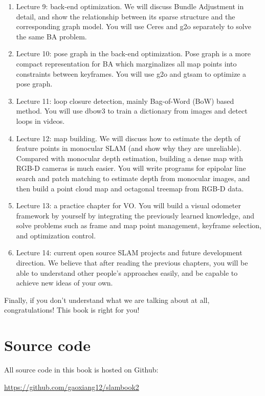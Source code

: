 \begin{enumerate}
	\item Lecture 9: back-end optimization. We will discuss Bundle Adjustment in detail, and show the relationship between its sparse structure and the corresponding graph model. You will use Ceres and g2o separately to solve the same BA problem.
	
	\item Lecture 10: pose graph in the back-end optimization. Pose graph is a more compact representation for BA which marginalizes all map points into constraints between keyframes. You will use g2o and gtsam to optimize a pose graph.
	
	\item Lecture 11: loop closure detection, mainly Bag-of-Word (BoW) based method. You will use dbow3 to train a dictionary from images and detect loops in videos. 
	
	\item Lecture 12: map building. We will discuss how to estimate the depth of feature points in monocular SLAM  (and show why they are unreliable). Compared with monocular depth estimation, building a dense map with RGB-D cameras is much easier. You will write programs for epipolar line search and patch matching to estimate depth from monocular images, and then build a point cloud map and octagonal treemap from RGB-D data.
	
	\item Lecture 13: a practice chapter for VO. You will build a visual odometer framework by yourself by integrating the previously learned knowledge, and solve problems such as frame and map point management, keyframe selection, and optimization control.
	
	\item Lecture 14: current open source SLAM projects and future development direction. We believe that after reading the previous chapters, you will be able to understand other people's approaches easily, and be capable to achieve new ideas of your own.
\end{enumerate}

Finally, if you don't understand what we are talking about at all, congratulations! This book is right for you! 

\section{Source code}

All source code in this book is hosted on Github:

{\hfill\url{https://github.com/gaoxiang12/slambook2}\hfill}

